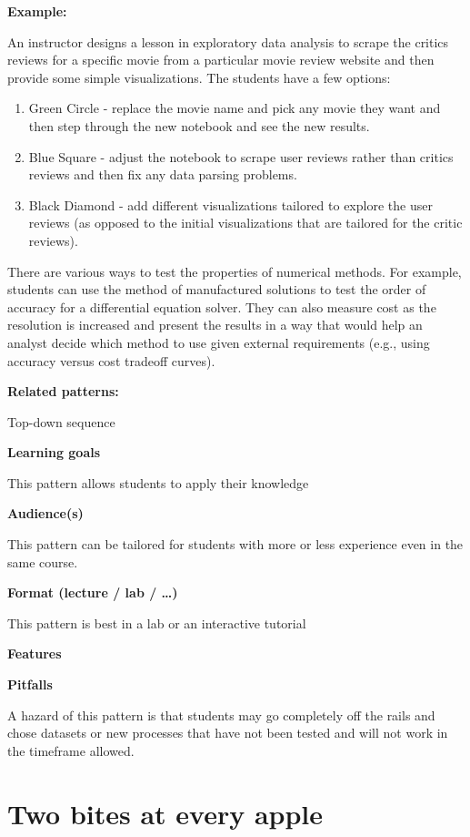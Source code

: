 \documentclass[]{book}
\providecommand{\tightlist}{%
  \setlength{\itemsep}{0pt}\setlength{\parskip}{0pt}}
\begin{document}
\textbf{Example:}

An instructor designs a lesson in exploratory data analysis to scrape
the critics reviews for a specific movie from a particular movie review
website and then provide some simple visualizations. The students have a
few options:

\begin{enumerate}
\def\labelenumi{\arabic{enumi}.}
\tightlist
\item
  Green Circle - replace the movie name and pick any movie they want and
  then step through the new notebook and see the new results.
\item
  Blue Square - adjust the notebook to scrape user reviews rather than
  critics reviews and then fix any data parsing problems.
\item
  Black Diamond - add different visualizations tailored to explore the
  user reviews (as opposed to the initial visualizations that are
  tailored for the critic reviews).
\end{enumerate}

There are various ways to test the properties of numerical methods. For
example, students can use the method of manufactured solutions to test
the order of accuracy for a differential equation solver. They can also
measure cost as the resolution is increased and present the results in a
way that would help an analyst decide which method to use given external
requirements (e.g., using accuracy versus cost tradeoff curves).

\textbf{Related patterns:}

Top-down sequence

\textbf{Learning goals}

This pattern allows students to apply their knowledge

\textbf{Audience(s)}

This pattern can be tailored for students with more or less experience
even in the same course.

\textbf{Format (lecture / lab / \ldots{})}

This pattern is best in a lab or an interactive tutorial

\textbf{Features}

\textbf{Pitfalls}

A hazard of this pattern is that students may go completely off the
rails and chose datasets or new processes that have not been tested and
will not work in the timeframe allowed.

\section{Two bites at every apple}\label{two-bites-at-every-apple}
\end{document}

